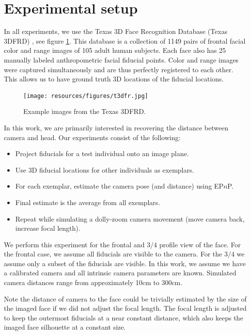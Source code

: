\documentclass[runningheads]{llncs}
\newcommand {\EPnP} {EP$n$P}
\begin{document}
\section{Experimental setup}
In all experiments, we use the Texas 3D Face Recognition Database (Texas 3DFRD) \cite{gupta2010texas}, see figure \ref{fig:t3dfrd}.  
This database is a collection of 1149 pairs of frontal facial color and range images of 105 adult human subjects.  
Each face also has 25 manually labeled anthropometric facial fiducial points.  
Color and range images were captured simultaneously and are thus perfectly registered to each other.  
This allows us to have ground truth 3D locations of the fiducial locations.  
\begin{figure}[h]
\centering
\texttt{[image: resources/figures/t3dfr.jpg]}
\caption{Example images from the Texas 3DFRD.}
\label{fig:t3dfrd}
\end{figure}
In this work, we are primarily interested in recovering the distance between camera and head.  Our experiments consist of the following:

\begin{itemize}
\item Project fiducials for a test individual onto an image plane.
\item Use 3D fiducial locations for other individuals as exemplars.
\item For each exemplar, estimate the camera pose (and distance) using \EPnP.
\item Final estimate is the average from all exemplars.
\item Repeat while simulating a dolly-zoom camera movement (move camera back, increase focal length).  
\end{itemize}

We perform this experiment for the frontal and $3/4$ profile view of the face.  
For the frontal case, we assume all fiducials are visible to the camera.  
For the $3/4$ we assume only a subset of the fiducials are visible. 
In this work, we assume we have a calibrated camera and all intrinsic camera parameters are known.  
Simulated camera distances range from approximately 10cm to 300cm.

Note the distance of camera to the face could be trivially estimated by the size of the imaged face if we did not adjust the focal length. 
The focal length is adjusted to keep the outermost fiducials at a near constant distance, which also keeps the imaged face silhouette at a constant size.
\end{document}
